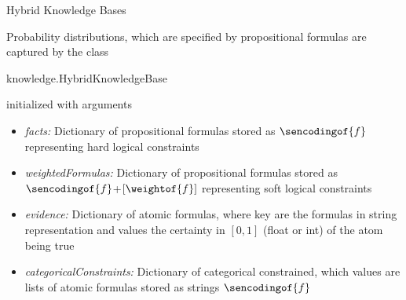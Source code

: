 \documentclass{beamer}
\begin{document}
\begin{frame}{Hybrid Knowledge Bases}

Probability distributions, which are specified by propositional formulas are captured by the class
\begin{centeredscript}
	knowledge.HybridKnowledgeBase
\end{centeredscript}
initialized with arguments
\begin{itemize}
	\item \emph{facts:} Dictionary of propositional formulas stored as $\sencodingof{\exformula}$ representing hard logical constraints
	\item \emph{weightedFormulas:} Dictionary of propositional formulas stored as $\sencodingof{\exformula}$+$[\weightof{\exformula}]$ representing soft logical constraints
	\item \emph{evidence:} Dictionary of atomic formulas, where key are the formulas in string representation and values the certainty in $[0,1]$ (float or int) of the atom being true
	\item \emph{categoricalConstraints:} Dictionary of categorical constrained, which values are lists of atomic formulas stored as strings $\sencodingof{\atomicformula}$
\end{itemize}

\end{frame}


%
%
%
%
\end{document}
